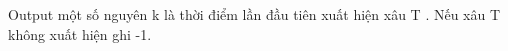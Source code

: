 Output
một số nguyên k là thời điểm lần đầu tiên xuất hiện xâu T . Nếu xâu T không xuất hiện ghi -1.